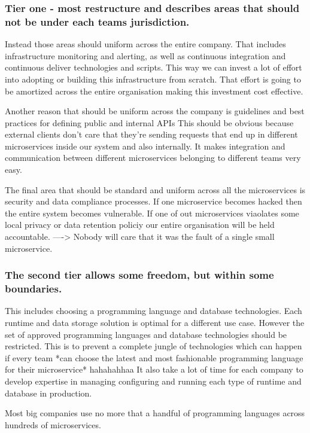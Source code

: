 \documentclass[a4paper, 11pt]{book}
\begin{document}
    \subsubsection{Tier one - most restructure and describes areas that should not be under each teams jurisdiction.}
    Instead those areas should uniform across the entire company.
    That includes infrastructure monitoring and alerting, as well as continuous integration and continuous deliver technologies and scripts.
    This way we can invest a lot of effort into adopting or building this infrastructure from scratch.
    That effort is going to be amortized across the entire organisation making this investment cost effective.

    Another reason that should be uniform across the company is guidelines and best practices for defining public and internal APIs
    This should be obvious because external clients don't care that they're sending requests that end up in different microservices inside our system and also internally.
    It makes integration and communication between different microservices belonging to different teams very easy.

    The final area that should be standard and uniform across all the microservices is security and data compliance processes.
    If one microservice becomes hacked then the entire system becomes vulnerable. If one of out microservices viaolates some local privacy or data retention policiy our entire organisation will be held accountable.
    ----> Nobody will care that it was the fault of a single small microservice.

    \subsubsection{The second tier allows some freedom, but within some boundaries.}
    This includes choosing a programming language and database technologies.
    Each runtime and data storage solution is optimal for a different use case.
    However the set of approved programming languages and database technologies should be restricted.
    This is to prevent a complete jungle of technologies which can happen if every team *can choose the latest and most fashionable programming language for their microservice* hahahahhaa
    It also take a lot of time for each company to develop expertise in managing configuring and running each type of runtime and database in production.

    Most big companies use no more that a handful of programming languages across hundreds of microservices.
\end{document}

